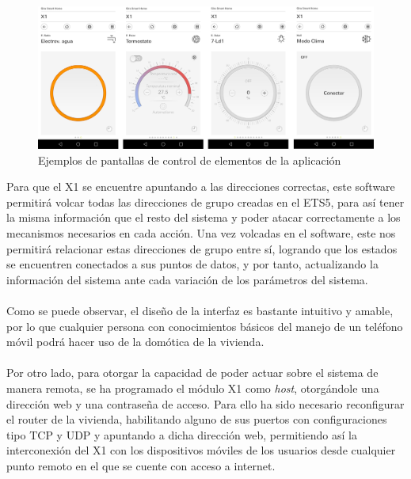 \begin{figure}[H]
\centering
\includegraphics[width=1\textwidth]{figures/prog_x1_4.png}   
\caption{Ejemplos de pantallas de control de elementos de la aplicación}
\label{fig:prog_x1_4}
\end{figure}

Para que el X1 se encuentre apuntando a las direcciones correctas, este software permitirá volcar todas las direcciones de grupo creadas en el ETS5, para así tener la misma información que el resto del sistema y poder atacar correctamente a los mecanismos necesarios en cada acción. Una vez volcadas en el software, este nos permitirá relacionar estas direcciones de grupo entre sí, logrando que los estados se encuentren conectados a sus puntos de datos, y por tanto, actualizando la información del sistema ante cada variación de los parámetros del sistema.\\\\
Como se puede observar, el diseño de la interfaz es bastante intuitivo y amable, por lo que cualquier persona con conocimientos básicos del manejo de un teléfono móvil podrá hacer uso de la domótica de la vivienda.\\\\
Por otro lado, para otorgar la capacidad de poder actuar sobre el sistema de manera remota, se ha programado el módulo X1 como \textit{host}, otorgándole una dirección web y una contraseña de acceso. Para ello ha sido necesario reconfigurar el router de la vivienda, habilitando alguno de sus puertos con configuraciones tipo TCP y UDP y apuntando a dicha dirección web, permitiendo así la interconexión del X1 con los dispositivos móviles de los usuarios desde cualquier punto remoto en el que se cuente con acceso a internet. 
